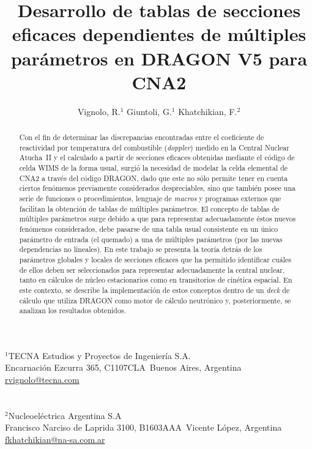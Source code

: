 \documentclass[11pt]{article}
\makeatletter
\def\affiliation#1{\def\@affiliation{#1}}
\def\maketitle{%
\thispagestyle{empty}

\null
\vspace{0.5cm plus 0.5cm minus 0.5cm}

\begin{center}
\begin{minipage}{0.8\linewidth}
\begin{center}
\Large{\textbf{\textsc{\@title}}}

\vspace{0.75cm plus 0.2cm minus 0.1cm}

\large{\@author}

\vspace{1.25cm plus 0.25cm minus 0.25cm}

\small{\@affiliation}
\vspace{1cm plus 0.2cm minus 0.2cm}

\end{center}
\end{minipage}
\end{center}

}
\makeatother
\begin{document}
\title{Desarrollo de tablas de secciones eficaces dependientes de múltiples parámetros en DRAGON V5 para CNA2}
\author{Vignolo, R.$^{1}$ \quad Giuntoli, G.$^{1}$ \quad Khatchikian, F.$^{2}$}
\affiliation{%
$^1$TECNA Estudios y Proyectos de Ingeniería S.A.\\
Encarnaci\'on Ezcurra 365, C1107CLA~Buenos Aires, Argentina\\
\url{rvignolo@tecna.com}\\
~\\
~\\
$^2$Nucleoeléctrica Argentina S.A\\
Francisco Narciso de Laprida 3100, B1603AAA~Vicente López, Argentina\\
\url{fkhatchikian@na-sa.com.ar}\\
}


\maketitle


\begin{abstract}
\noindent
Con el fin de determinar las discrepancias encontradas entre el coeficiente de reactividad por temperatura del combustible (\emph{doppler}) medido en la Central Nuclear Atucha~II y el calculado a partir de secciones eficaces obtenidas mediante el código de celda WIMS de la forma usual, surgió la necesidad de modelar la celda elemental de CNA2 a través del código DRAGON, dado que este no sólo permite tener en cuenta ciertos fenómenos previamente considerados despreciables, sino que también posee una serie de funciones o procedimientos, lenguaje de \emph{macros} y programas externos que facilitan la obtención de tablas de múltiples parámetros. El concepto de tablas de múltiples parámetros surge debido a que para representar adecuadamente éstos nuevos fenómenos considerados, debe pasarse de una tabla usual consistente en un único parámetro de entrada (el quemado) a una de múltiples parámetros (por las nuevas dependencias no lineales). En este trabajo se presenta la teoría detrás de los parámetros globales y locales de secciones eficaces que ha permitido identificar cuáles de ellos deben ser seleccionados para representar adecuadamente la central nuclear, tanto en cálculos de núcleo estacionarios como en transitorios de cinética espacial. En este contexto, se describe la implementación de estos conceptos dentro de un \emph{deck} de cálculo que utiliza DRAGON como motor de cálculo neutrónico y, posteriormente, se analizan los resultados obtenidos.
\end{abstract}
\end{document}
